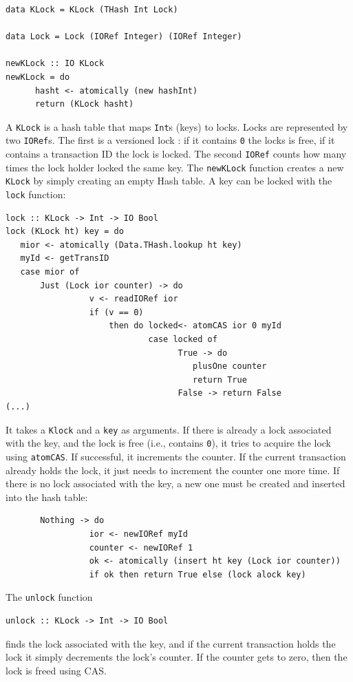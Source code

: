 \documentclass{llncs}
\begin{document}
{\small\begin{verbatim}
data KLock = KLock (THash Int Lock)

data Lock = Lock (IORef Integer) (IORef Integer)

newKLock :: IO KLock
newKLock = do
      hasht <- atomically (new hashInt)
      return (KLock hasht)
\end{verbatim}}

A {\tt KLock} is a hash table that maps {\tt Int}s (keys) to locks. Locks are represented by
two {\tt IORef}s. The first is a versioned lock \cite{stmbook2}: if it  contains  {\tt 0} the locks is free, if it contains a transaction ID
the lock is locked. The second {\tt IORef} counts how many times the lock holder locked the same key.
The {\tt newKLock} function creates a new {\tt KLock} by simply creating an empty Hash table.
A key can be locked with the {\tt lock} function:

{\small\begin{verbatim}
lock :: KLock -> Int -> IO Bool
lock (KLock ht) key = do
   mior <- atomically (Data.THash.lookup ht key)
   myId <- getTransID
   case mior of 
       Just (Lock ior counter) -> do
                 v <- readIORef ior
                 if (v == 0) 
                     then do locked<- atomCAS ior 0 myId
                             case locked of
                                   True -> do
                                      plusOne counter
                                      return True
                                   False -> return False
(...)
\end{verbatim}} 

It takes a {\tt Klock} and a {\tt key} as arguments. If there is already a lock associated
with the key, and the lock is free (i.e., contains {\tt 0}), 
it tries to acquire the lock using {\tt atomCAS}. If successful, it increments the counter.
If the current transaction already holds the lock, it just needs to increment the counter one more time.
If there is no lock associated with the key, a new one must be created and inserted into the hash table:
{\small\begin{verbatim}
       Nothing -> do
                 ior <- newIORef myId
                 counter <- newIORef 1
                 ok <- atomically (insert ht key (Lock ior counter))
                 if ok then return True else (lock alock key)
\end{verbatim}}


The {\tt unlock} function
{\small\begin{verbatim}
unlock :: KLock -> Int -> IO Bool
\end{verbatim}}
finds the lock associated with the key, and if the current transaction holds the lock it simply decrements
the lock's counter. If the counter gets to zero, then the lock is freed using CAS.
\end{document}

